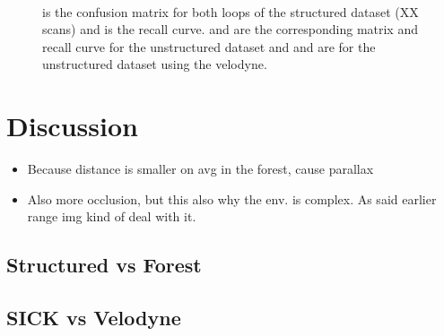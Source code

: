 \begin{figure}[H]
     \\
    \caption[todo]{\protect{} is the confusion matrix for both loops of the structured dataset (XX scans) and \protect{} is the recall curve. \protect{} and \protect{} are the corresponding matrix and recall curve for the unstructured dataset and \protect{} and \protect{} are for the unstructured dataset using the velodyne.}
    \label{fig:chap_slam_results}
\end{figure}



\section{Discussion}
\label{sec:chap_slam_discussion}
\begin{itemize}
    \item Because distance is smaller on avg in the forest, cause parallax
    \item Also more occlusion, but this also why the env. is complex. As said earlier range img kind of deal with it.
\end{itemize}

\subsection{Structured vs Forest}
\label{ssec:chap_slam_struct_vs_forest}

\subsection{SICK vs Velodyne}
\label{ssec:chap_slam_sick_vs_velodyne}

